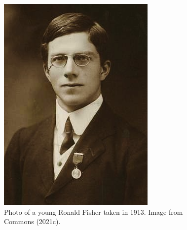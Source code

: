 \documentclass[
]{book}
\begin{document}
\begin{figure}

\includegraphics[width=1\linewidth]{figs/introduction/Youngronaldfisher2} \hfill{}

\caption{Photo of a young Ronald Fisher taken in 1913. Image from Commons (2021c).}\label{fig:fisher}
\end{figure}
\end{document}
